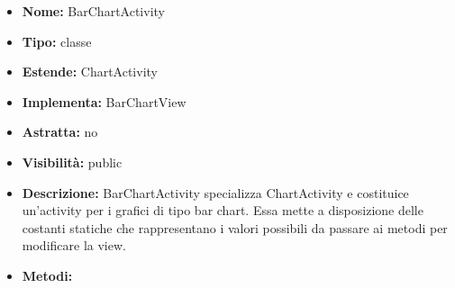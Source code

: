 			
			\begin{itemize}
			\item \textbf{Nome:} BarChartActivity
			\item \textbf{Tipo:} classe
			
		\item \textbf{Estende:}
		ChartActivity
		\item \textbf{Implementa:}
		BarChartView
		\item \textbf{Astratta:}
		no
			\item \textbf{Visibilità:} public
			\item \textbf{Descrizione:} BarChartActivity specializza ChartActivity e costituice un'activity per i grafici di tipo bar chart. Essa mette a disposizione delle costanti statiche che rappresentano i valori possibili da passare ai metodi per modificare la view.
			\item \textbf{Metodi:}
				\begin{itemize}
				\setlength{\itemsep}{5pt}
				

\end{itemize}
\end{itemize}
